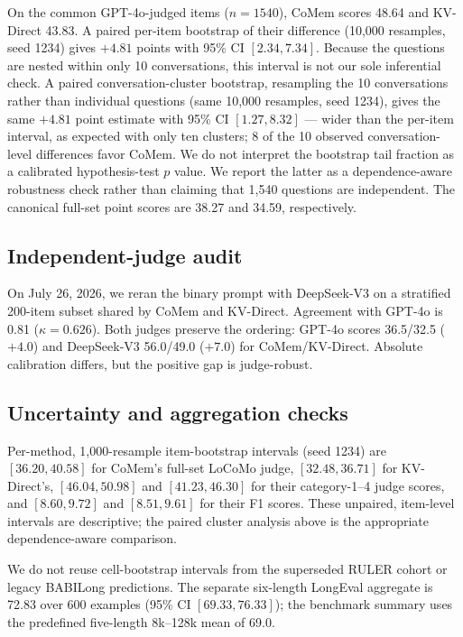 On the common GPT-4o-judged items ($n{=}1540$), CoMem scores 48.64 and KV-Direct
43.83. A paired per-item bootstrap of their difference (10,000 resamples,
seed 1234) gives $+4.81$ points with 95\% CI $[2.34,7.34]$. Because the questions
are nested within only 10 conversations, this interval is not our sole
inferential check. A paired conversation-cluster bootstrap, resampling the 10
conversations rather than individual questions (same 10,000 resamples,
seed 1234), gives the same $+4.81$ point estimate with 95\% CI $[1.27,8.32]$ ---
wider than the per-item interval, as expected with only ten clusters; 8 of the
10 observed conversation-level differences favor CoMem. We do not interpret
the bootstrap tail fraction as a calibrated hypothesis-test $p$ value. We report the latter as a
dependence-aware robustness check rather than claiming that 1,540 questions are
independent. The canonical full-set point
scores are 38.27 and 34.59, respectively.

\FloatBarrier
\subsection{Independent-judge audit}
On July 26, 2026, we reran the binary prompt with DeepSeek-V3 on a stratified 200-item subset
shared by CoMem and KV-Direct. Agreement with GPT-4o is 0.81
($\kappa=0.626$). Both judges preserve the ordering: GPT-4o scores
36.5/32.5 ($+4.0$) and DeepSeek-V3 56.0/49.0 ($+7.0$) for CoMem/KV-Direct.
Absolute calibration differs, but the positive gap is judge-robust.

\subsection{Uncertainty and aggregation checks}
Per-method, 1,000-resample item-bootstrap intervals (seed 1234) are
$[36.20,40.58]$ for CoMem's full-set LoCoMo judge, $[32.48,36.71]$ for
KV-Direct's, $[46.04,50.98]$ and $[41.23,46.30]$ for their category-1--4 judge
scores, and $[8.60,9.72]$ and $[8.51,9.61]$ for their F1 scores. These unpaired,
item-level intervals are descriptive; the paired cluster analysis above is the
appropriate dependence-aware comparison.

We do not reuse cell-bootstrap intervals from the superseded RULER cohort or
legacy BABILong predictions. The separate six-length LongEval aggregate is
72.83 over 600 examples (95\% CI $[69.33,76.33]$); the benchmark summary
uses the predefined five-length 8k--128k mean of 69.0.
